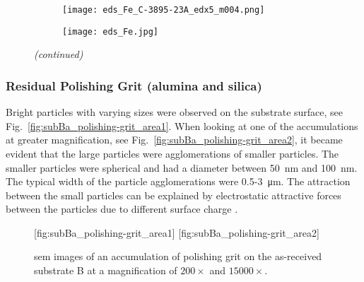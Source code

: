 %
\begin{figure}[htbp]
\ContinuedFloat
    \centering
    \begin{subfigure}[t]{\textwidth}
    \caption{}\label{fig:subBa_partice_Fe}
          \begin{minipage}[t]{0.43\linewidth}
            \centering
            \texttt{[image: eds\_Fe\_C-3895-23A\_edx5\_m004.png]}
          \end{minipage}
          \hfill
          \begin{minipage}[t]{0.43\linewidth}
            \centering
            \texttt{[image: eds\_Fe.jpg]}
          \end{minipage}
          \begin{minipage}[t]{0.11\linewidth}
            \centering
            \atomicTable[\ce{Fe}&\SI{80.20}{}][\ce{C}&\SI{12.71}{}][\ce{Cd}&\SI{3.74}{}][\ce{Te}&\SI{3.35}{}]
          \end{minipage}
    \end{subfigure}%
    \captionsetup{list=no}
    \caption{\emph{(continued)}}
\end{figure}

\subsubsection{Residual Polishing Grit (alumina and silica)}
Bright particles with varying sizes were observed on the substrate surface, see Fig.~\ref{fig:subBa_polishing-grit_area1}. When looking at one of the accumulations at greater magnification, see Fig.~\ref{fig:subBa_polishing-grit_area2}, it became evident that the large particles were agglomerations of smaller particles. The smaller particles were spherical and had a diameter between \SI{50}{\nano\metre} and \SI{100}{\nano\metre}. The typical width of the particle agglomerations were \SI{0.5}{}-\SI{3}{\micro\metre}. The attraction between the small particles can be explained by electrostatic attractive forces between the particles due to different surface charge \citep{allen2001review}.

\begin{figure}[htbp]
    \centering
        [fig:subBa_polishing-grit_area1]
        \hfill
        [fig:subBa_polishing-grit_area2]
    \caption[\Ac{sem} images of an accumulaton of polishing grit on substrate B.]{\Ac{sem} images of an accumulation of polishing grit on the as-received substrate B at a magnification of  $200\times$ and  $15000\times$.}\label{fig:subBa_polishing-grit_area}
\end{figure}

